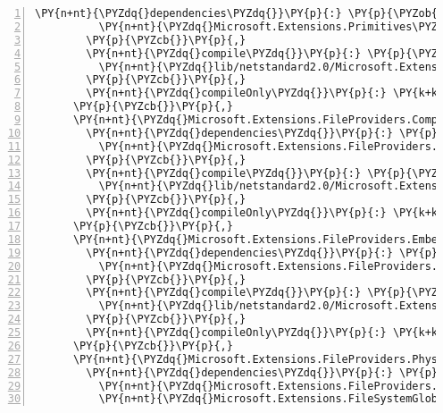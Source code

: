 \begin{Verbatim}[commandchars=\\\{\},numbers=left,firstnumber=1,stepnumber=1,numberblanklines=0]
        \PY{n+nt}{\PYZdq{}dependencies\PYZdq{}}\PY{p}{:} \PY{p}{\PYZob{}}
          \PY{n+nt}{\PYZdq{}Microsoft.Extensions.Primitives\PYZdq{}}\PY{p}{:} \PY{l+s+s2}{\PYZdq{}2.1.0\PYZhy{}rc1\PYZhy{}final\PYZdq{}}
        \PY{p}{\PYZcb{}}\PY{p}{,}
        \PY{n+nt}{\PYZdq{}compile\PYZdq{}}\PY{p}{:} \PY{p}{\PYZob{}}
          \PY{n+nt}{\PYZdq{}lib/netstandard2.0/Microsoft.Extensions.FileProviders.Abstractions.dll\PYZdq{}}\PY{p}{:} \PY{p}{\PYZob{}}\PY{p}{\PYZcb{}}
        \PY{p}{\PYZcb{}}\PY{p}{,}
        \PY{n+nt}{\PYZdq{}compileOnly\PYZdq{}}\PY{p}{:} \PY{k+kc}{true}
      \PY{p}{\PYZcb{}}\PY{p}{,}
      \PY{n+nt}{\PYZdq{}Microsoft.Extensions.FileProviders.Composite/2.1.0\PYZhy{}rc1\PYZhy{}final\PYZdq{}}\PY{p}{:} \PY{p}{\PYZob{}}
        \PY{n+nt}{\PYZdq{}dependencies\PYZdq{}}\PY{p}{:} \PY{p}{\PYZob{}}
          \PY{n+nt}{\PYZdq{}Microsoft.Extensions.FileProviders.Abstractions\PYZdq{}}\PY{p}{:} \PY{l+s+s2}{\PYZdq{}2.1.0\PYZhy{}rc1\PYZhy{}final\PYZdq{}}
        \PY{p}{\PYZcb{}}\PY{p}{,}
        \PY{n+nt}{\PYZdq{}compile\PYZdq{}}\PY{p}{:} \PY{p}{\PYZob{}}
          \PY{n+nt}{\PYZdq{}lib/netstandard2.0/Microsoft.Extensions.FileProviders.Composite.dll\PYZdq{}}\PY{p}{:} \PY{p}{\PYZob{}}\PY{p}{\PYZcb{}}
        \PY{p}{\PYZcb{}}\PY{p}{,}
        \PY{n+nt}{\PYZdq{}compileOnly\PYZdq{}}\PY{p}{:} \PY{k+kc}{true}
      \PY{p}{\PYZcb{}}\PY{p}{,}
      \PY{n+nt}{\PYZdq{}Microsoft.Extensions.FileProviders.Embedded/2.1.0\PYZhy{}rc1\PYZhy{}final\PYZdq{}}\PY{p}{:} \PY{p}{\PYZob{}}
        \PY{n+nt}{\PYZdq{}dependencies\PYZdq{}}\PY{p}{:} \PY{p}{\PYZob{}}
          \PY{n+nt}{\PYZdq{}Microsoft.Extensions.FileProviders.Abstractions\PYZdq{}}\PY{p}{:} \PY{l+s+s2}{\PYZdq{}2.1.0\PYZhy{}rc1\PYZhy{}final\PYZdq{}}
        \PY{p}{\PYZcb{}}\PY{p}{,}
        \PY{n+nt}{\PYZdq{}compile\PYZdq{}}\PY{p}{:} \PY{p}{\PYZob{}}
          \PY{n+nt}{\PYZdq{}lib/netstandard2.0/Microsoft.Extensions.FileProviders.Embedded.dll\PYZdq{}}\PY{p}{:} \PY{p}{\PYZob{}}\PY{p}{\PYZcb{}}
        \PY{p}{\PYZcb{}}\PY{p}{,}
        \PY{n+nt}{\PYZdq{}compileOnly\PYZdq{}}\PY{p}{:} \PY{k+kc}{true}
      \PY{p}{\PYZcb{}}\PY{p}{,}
      \PY{n+nt}{\PYZdq{}Microsoft.Extensions.FileProviders.Physical/2.1.0\PYZhy{}rc1\PYZhy{}final\PYZdq{}}\PY{p}{:} \PY{p}{\PYZob{}}
        \PY{n+nt}{\PYZdq{}dependencies\PYZdq{}}\PY{p}{:} \PY{p}{\PYZob{}}
          \PY{n+nt}{\PYZdq{}Microsoft.Extensions.FileProviders.Abstractions\PYZdq{}}\PY{p}{:} \PY{l+s+s2}{\PYZdq{}2.1.0\PYZhy{}rc1\PYZhy{}final\PYZdq{}}\PY{p}{,}
          \PY{n+nt}{\PYZdq{}Microsoft.Extensions.FileSystemGlobbing\PYZdq{}}\PY{p}{:} \PY{l+s+s2}{\PYZdq{}2.1.0\PYZhy{}rc1\PYZhy{}final\PYZdq{}}

\end{Verbatim}
